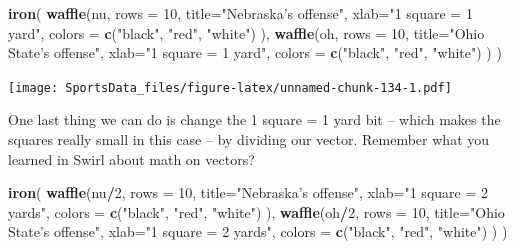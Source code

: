 \documentclass[
]{book}
\newenvironment{Shaded}{\begin{snugshade}}{\end{snugshade}}
\newcommand{\DataTypeTok}[1]{\textcolor[rgb]{0.13,0.29,0.53}{#1}}
\newcommand{\DecValTok}[1]{\textcolor[rgb]{0.00,0.00,0.81}{#1}}
\newcommand{\KeywordTok}[1]{\textcolor[rgb]{0.13,0.29,0.53}{\textbf{#1}}}
\newcommand{\NormalTok}[1]{#1}
\newcommand{\OperatorTok}[1]{\textcolor[rgb]{0.81,0.36,0.00}{\textbf{#1}}}
\newcommand{\StringTok}[1]{\textcolor[rgb]{0.31,0.60,0.02}{#1}}
\begin{document}
\begin{Shaded}
\begin{Highlighting}[]
\KeywordTok{iron}\NormalTok{(}
 \KeywordTok{waffle}\NormalTok{(nu, }
        \DataTypeTok{rows =} \DecValTok{10}\NormalTok{, }
        \DataTypeTok{title=}\StringTok{"Nebraska's offense"}\NormalTok{, }
        \DataTypeTok{xlab=}\StringTok{"1 square = 1 yard"}\NormalTok{, }
        \DataTypeTok{colors =} \KeywordTok{c}\NormalTok{(}\StringTok{"black"}\NormalTok{, }\StringTok{"red"}\NormalTok{, }\StringTok{"white"}\NormalTok{)}
\NormalTok{        ),}
 \KeywordTok{waffle}\NormalTok{(oh, }
        \DataTypeTok{rows =} \DecValTok{10}\NormalTok{, }
        \DataTypeTok{title=}\StringTok{"Ohio State's offense"}\NormalTok{, }
        \DataTypeTok{xlab=}\StringTok{"1 square = 1 yard"}\NormalTok{, }
        \DataTypeTok{colors =} \KeywordTok{c}\NormalTok{(}\StringTok{"black"}\NormalTok{, }\StringTok{"red"}\NormalTok{, }\StringTok{"white"}\NormalTok{)}
\NormalTok{        )}
\NormalTok{)}
\end{Highlighting}
\end{Shaded}

\texttt{[image: SportsData\_files/figure-latex/unnamed-chunk-134-1.pdf]}

One last thing we can do is change the 1 square = 1 yard bit -- which makes the squares really small in this case -- by dividing our vector. Remember what you learned in Swirl about math on vectors?

\begin{Shaded}
\begin{Highlighting}[]
\KeywordTok{iron}\NormalTok{(}
 \KeywordTok{waffle}\NormalTok{(nu}\OperatorTok{/}\DecValTok{2}\NormalTok{, }
        \DataTypeTok{rows =} \DecValTok{10}\NormalTok{, }
        \DataTypeTok{title=}\StringTok{"Nebraska's offense"}\NormalTok{, }
        \DataTypeTok{xlab=}\StringTok{"1 square = 2 yards"}\NormalTok{, }
        \DataTypeTok{colors =} \KeywordTok{c}\NormalTok{(}\StringTok{"black"}\NormalTok{, }\StringTok{"red"}\NormalTok{, }\StringTok{"white"}\NormalTok{)}
\NormalTok{        ),}
 \KeywordTok{waffle}\NormalTok{(oh}\OperatorTok{/}\DecValTok{2}\NormalTok{, }
        \DataTypeTok{rows =} \DecValTok{10}\NormalTok{, }
        \DataTypeTok{title=}\StringTok{"Ohio State's offense"}\NormalTok{, }
        \DataTypeTok{xlab=}\StringTok{"1 square = 2 yards"}\NormalTok{, }
        \DataTypeTok{colors =} \KeywordTok{c}\NormalTok{(}\StringTok{"black"}\NormalTok{, }\StringTok{"red"}\NormalTok{, }\StringTok{"white"}\NormalTok{)}
\NormalTok{        )}
\NormalTok{)}
\end{Highlighting}
\end{Shaded}
\end{document}
